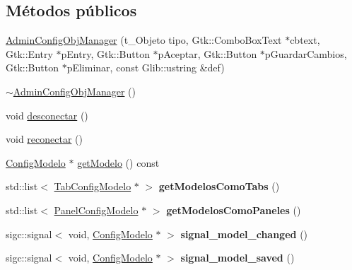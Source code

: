 \subsection*{\-Métodos públicos}
\begin{DoxyCompactItemize}
\item 
\hyperlink{classAdminConfigObjManager_ac1cf996dac14964ef66fa2a58cb203cc}{\-Admin\-Config\-Obj\-Manager} (t\-\_\-\-Objeto tipo, \-Gtk\-::\-Combo\-Box\-Text $\ast$cbtext, \-Gtk\-::\-Entry $\ast$p\-Entry, \-Gtk\-::\-Button $\ast$p\-Aceptar, \-Gtk\-::\-Button $\ast$p\-Guardar\-Cambios, \-Gtk\-::\-Button $\ast$p\-Eliminar, const \-Glib\-::ustring \&def)
\item 
\hyperlink{classAdminConfigObjManager_a0ad7c3b6f6efbd2dc9ed22a10419a262}{$\sim$\-Admin\-Config\-Obj\-Manager} ()
\item 
void \hyperlink{classAdminConfigObjManager_af1ffbc3bf75851e87b596c664769720c}{desconectar} ()
\item 
void \hyperlink{classAdminConfigObjManager_a2c1bd9dab0e7549e07792e77ba639f63}{reconectar} ()
\item 
\hyperlink{classConfigModelo}{\-Config\-Modelo} $\ast$ \hyperlink{classAdminConfigObjManager_a988c37775c19546db9c20d099c3b6cf1}{get\-Modelo} () const 
\item 
\hypertarget{classAdminConfigObjManager_ad110baeb7c0888dcf09bb5d72f1d7e37}{std\-::list$<$ \hyperlink{classTabConfigModelo}{\-Tab\-Config\-Modelo} $\ast$ $>$ {\bfseries get\-Modelos\-Como\-Tabs} ()}\label{classAdminConfigObjManager_ad110baeb7c0888dcf09bb5d72f1d7e37}

\item 
\hypertarget{classAdminConfigObjManager_a7d7fe15793209afad0c51853e778acef}{std\-::list$<$ \hyperlink{classPanelConfigModelo}{\-Panel\-Config\-Modelo} $\ast$ $>$ {\bfseries get\-Modelos\-Como\-Paneles} ()}\label{classAdminConfigObjManager_a7d7fe15793209afad0c51853e778acef}

\item 
\hypertarget{classAdminConfigObjManager_a471986147f5b118b418c350a0f06088c}{sigc\-::signal$<$ void, \*
\hyperlink{classConfigModelo}{\-Config\-Modelo} $\ast$ $>$ {\bfseries signal\-\_\-model\-\_\-changed} ()}\label{classAdminConfigObjManager_a471986147f5b118b418c350a0f06088c}

\item 
\hypertarget{classAdminConfigObjManager_aa1702ac8baace3d410a3379d9acbfb5e}{sigc\-::signal$<$ void, \*
\hyperlink{classConfigModelo}{\-Config\-Modelo} $\ast$ $>$ {\bfseries signal\-\_\-model\-\_\-saved} ()}\label{classAdminConfigObjManager_aa1702ac8baace3d410a3379d9acbfb5e}


\end{DoxyCompactItemize}
